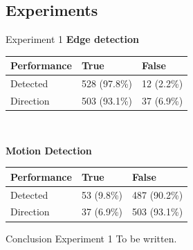 \documentclass{beamer}
\begin{document}
\subsection{Experiments}
\begin{frame}
\begin{block}{Experiment 1}
\textbf{Edge detection}\\\vspace{0.1cm}
\begin{tabular}{| l | l | l |}
\hline
\textbf{Performance} & True & False\\
\hline
Detected  & 528 (97.8\%) & 12 (2.2\%)\\
\hline
Direction & 503 (93.1\%) & 37 (6.9\%)\\
\hline
\end{tabular}\\\vspace{0.1cm}

\textbf{Motion Detection}\vspace{0.1cm}

\begin{tabular}{| l | l | l |}
\hline
\textbf{Performance} & True & False\\
\hline
Detected  & 53 (9.8\%) & 487 (90.2\%)\\
\hline
Direction & 37 (6.9\%) & 503 (93.1\%)\\
\hline
\end{tabular}
\end{block}
\end{frame}

\begin{frame}
\begin{block}{Conclusion Experiment 1}
To be written.
\end{block}
\end{frame}
\end{document}

